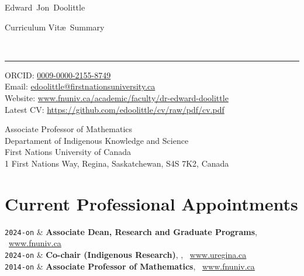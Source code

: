 \documentclass[9pt,a4paper]{article}
\makeatletter
\newcommand{\FNUniv}{First Nations University of Canada}
\newcommand{\UofR}{University of Regina}
\newcommand{\Title}{Curriculum Vit\ae\ Summary}
\newcommand{\FirstName}{Edward}
\newcommand{\MiddleName}{Jon}
\newcommand{\LastName}{Doolittle}
\newcommand{\MyName}{\FirstName\ \MiddleName\ \LastName}
\newcommand{\Email}{edoolittle@firstnationsuniversity.ca}
\newcommand{\PersonalWebsite}{www.fnuniv.ca/academic/faculty/dr-edward-doolittle}
\newcommand{\LabWebsite}{www.fnuniv.ca}
\newcommand{\ORCID}{0009-0000-2155-8749}
\newcommand{\Duration}[2]{\fontsize{10pt}{0}\selectfont \texttt{#1-#2}}
\newcommand{\Ongoing}{on}
\newcommand{\Website}[1]{\href{https://#1}{#1}}
\newcommand{\MYhref}[3][darkblue]{\href{#2}{\color{#1}{#3}}}
\makeatother
\begin{document}
\begin{minipage}[t]{0.5\textwidth}
  {\fontsize{20pt}{0}\selectfont\MyName}
\end{minipage}
\begin{minipage}[t]{0.5\textwidth}
  \begin{flushright}
    \Title{}
  \end{flushright}
\end{minipage}
\\[-0.1cm]
\textcolor{lightgray}{\rule{\textwidth}{3pt}}
\begin{minipage}[t]{0.45\textwidth}
  ORCID: \href{https://orcid.org/\ORCID}{\ORCID}
  \\
  Email: \href{mailto:\Email}{\Email}
  \\
  Website: \Website{\PersonalWebsite}
  \\
  Latest CV: \Website{https://github.com/edoolittle/cv/raw/pdf/cv.pdf}
\end{minipage}
\begin{minipage}[t]{0.55\textwidth}
  \begin{flushright}
  Associate Professor of Mathematics
  \\
  Departament of Indigenous Knowledge and Science
  \\
  First Nations University of Canada
  \\
  1 First Nations Way, Regina, Saskatchewan, S4S 7K2, Canada
  \end{flushright}
\end{minipage}
\vspace{0.3cm}

\section{Current Professional Appointments}

\begin{EntriesTableDuration}
  \Duration{2024}{\Ongoing} & \textbf{Associate Dean, Research and
    Graduate Programs}, \MYhref{https://www.fnuniv.ca}{\FNUniv}\
  \Website{www.fnuniv.ca} %
  \\ %
  \Duration{2024}{\Ongoing} & \textbf{Co-chair (Indigenous Research)},
  \MYhref{https://www.uregina.ca/research/office-research-services/human-research/index.html}{Research
    Ethics Board}, \MYhref{https://www.uregina.ca}{\UofR}\
  \Website{www.uregina.ca} %
  \\ %
  \Duration{2014}{\Ongoing} & \textbf{Associate Professor of
    Mathematics}, \MYhref{https://www.fnuniv.ca}{\FNUniv}\
  \Website{www.fnuniv.ca} %
\end{EntriesTableDuration}
\end{document}
